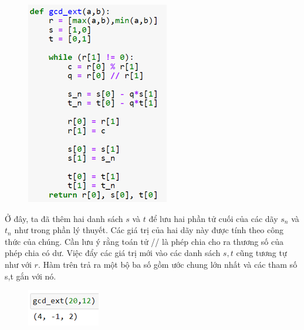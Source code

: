 \begin{multicols}{2}
\begin{figure}[H]
		\includegraphics[width=0.75\linewidth]{4}
		\vspace*{-10pt}
	\end{figure}
	Ở đây, ta đã thêm hai danh sách $s$ và $t$ để lưu hai phần tử cuối của các dãy $s_n$ và $t_n$ như trong phần lý thuyết. Các giá trị của hai dãy này được tính theo công thức của chúng. Cần lưu ý rằng toán tử // là phép chia cho ra thương số của phép chia có dư. Việc đẩy các giá trị mới vào các danh sách $s,t$ cũng tương tự như với $r$.
	\vskip 0.1cm
	Hàm trên trả ra một bộ ba số gồm ước chung lớn nhất và các tham số s,t gắn với nó.
	\begin{figure}[H]
		\centering
		\vspace*{-5pt}
		\captionsetup{labelformat= empty, justification=centering}
		\includegraphics[width=0.4\linewidth]{5}
		\vspace*{-10pt}
	\end{figure}

\end{multicols}
